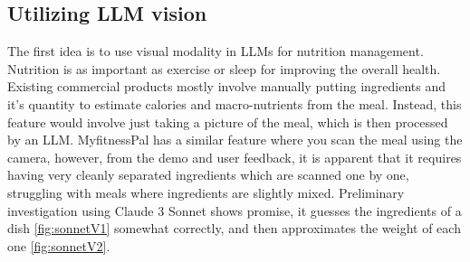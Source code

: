 \subsection{Utilizing LLM vision}
The first idea is to use visual modality in LLMs for nutrition management. Nutrition is as important as exercise or sleep for improving the overall health. Existing commercial products mostly involve manually putting ingredients and it's quantity to estimate calories and macro-nutrients from the meal. Instead, this feature would involve just taking a picture of the meal, which is then processed by an LLM. MyfitnessPal has a similar feature where you scan the meal using the camera, however, from the demo and user feedback, it is apparent that it requires having very cleanly separated ingredients which are scanned one by one, struggling with meals where ingredients are slightly mixed. Preliminary investigation using Claude 3 Sonnet shows promise, it guesses the ingredients of a dish \ref{fig:sonnetV1} somewhat correctly, and then approximates the weight of each one \ref{fig:sonnetV2}.

